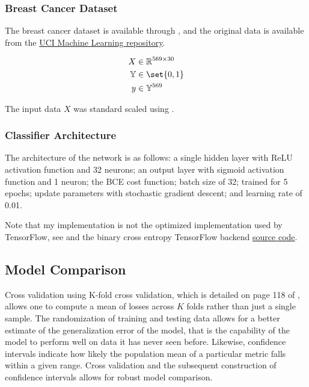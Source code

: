 \documentclass{article}
\DeclarePairedDelimiter\set\{\}
\begin{document}
\subsubsection{Breast Cancer Dataset}

The breast cancer dataset is available through , and
the original data is available from the
\href{https://archive.ics.uci.edu/ml/datasets/Breast+Cancer+Wisconsin+(Diagnostic)}{UCI Machine Learning repository}.

\begin{align}
	X          & \in \mathbb{R}^{569 \times 30} \\
	\mathbb{Y} & \in \set{0, 1}                 \\
	y          & \in \mathbb{Y}^{569}
\end{align}

The input data $X$ was standard scaled using .

\subsubsection{Classifier Architecture}

The architecture of the network is as follows: a single hidden layer with ReLU
activation function and 32 neurons; an output layer with sigmoid activation function
and 1 neuron; the BCE cost function; batch size of 32; trained for 5 epochs;
update parameters with stochastic gradient descent; and learning rate of 0.01.

Note that my implementation is not the optimized implementation used by
TensorFlow, see \cite{Khan2020} and the binary cross entropy TensorFlow backend
\href{https://github.com/keras-team/keras/blob/2c48a3b38b6b6139be2da501982fd2f61d7d48fe/keras/backend.py#L5129}{source code}.

\subsection{Model Comparison}

Cross validation using K-fold cross validation,
which is detailed on page 118 of \cite{Goodfellow2016}, allows one to compute
a mean of losses across $K$ folds rather than just a single sample. The
randomization of training and testing data allows for a better estimate of the
generalization error of the model, that is the capability of the model
to perform well on data it has never seen before. Likewise, confidence intervals
indicate how likely the population mean of a particular metric falls within a
given range. Cross validation and the subsequent construction of confidence
intervals allows for robust model comparison.
\end{document}
